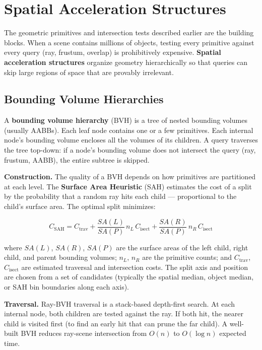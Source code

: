 \documentclass[
  11pt,
  letterpaper,
  DIV=11,
  numbers=noendperiod,
  twoside,
  open=right]{scrreprt}
\begin{document}
\section{Spatial Acceleration
Structures}\label{spatial-acceleration-structures}

The geometric primitives and intersection tests described earlier are
the building blocks. When a scene contains millions of objects, testing
every primitive against every query (ray, frustum, overlap) is
prohibitively expensive. \textbf{Spatial acceleration structures}
organize geometry hierarchically so that queries can skip large regions
of space that are provably irrelevant.

\subsection{Bounding Volume
Hierarchies}\label{bounding-volume-hierarchies}

A \textbf{bounding volume hierarchy} (BVH) is a tree of nested bounding
volumes (usually AABBs). Each leaf node contains one or a few
primitives. Each internal node's bounding volume encloses all the
volumes of its children. A query traverses the tree top-down: if a
node's bounding volume does not intersect the query (ray, frustum,
AABB), the entire subtree is skipped.

\textbf{Construction.} The quality of a BVH depends on how primitives
are partitioned at each level. The \textbf{Surface Area Heuristic} (SAH)
estimates the cost of a split by the probability that a random ray hits
each child --- proportional to the child's surface area. The optimal
split minimizes:

\[
C_{\text{SAH}} = C_{\text{trav}} + \frac{SA(L)}{SA(P)} \, n_L \, C_{\text{isect}} + \frac{SA(R)}{SA(P)} \, n_R \, C_{\text{isect}}
\]

where \(SA(L)\), \(SA(R)\), \(SA(P)\) are the surface areas of the left
child, right child, and parent bounding volumes; \(n_L\), \(n_R\) are
the primitive counts; and \(C_{\text{trav}}\), \(C_{\text{isect}}\) are
estimated traversal and intersection costs. The split axis and position
are chosen from a set of candidates (typically the spatial median,
object median, or SAH bin boundaries along each axis).

\textbf{Traversal.} Ray-BVH traversal is a stack-based depth-first
search. At each internal node, both children are tested against the ray.
If both hit, the nearer child is visited first (to find an early hit
that can prune the far child). A well-built BVH reduces ray-scene
intersection from \(O(n)\) to \(O(\log n)\) expected time.
\end{document}
